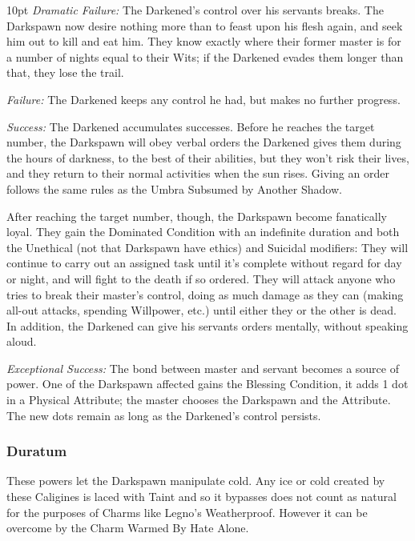 \begin{myindentpar}{10pt}    \emph{Dramatic Failure:} The Darkened's control over his servants breaks. The Darkspawn now desire nothing more than to feast upon his flesh again, and seek him out to kill and eat him. They know exactly where their former master is for a number of nights equal to their Wits; if the Darkened evades them longer than that, they lose the trail.

    \emph{Failure:} The Darkened keeps any control he had, but makes no further progress.

    \emph{Success:} The Darkened accumulates successes. Before he reaches the target number, the Darkspawn will obey verbal orders the Darkened gives them during the hours of darkness, to the best of their abilities, but they won't risk their lives, and they return to their normal activities when the sun rises. Giving an order follows the same rules as the Umbra Subsumed by Another Shadow.

    After reaching the target number, though, the Darkspawn become fanatically loyal. They gain the Dominated Condition with an indefinite duration and both the Unethical (not that Darkspawn have ethics) and Suicidal modifiers: They will continue to carry out an assigned task until it's complete without regard for day or night, and will fight to the death if so ordered. They will attack anyone who tries to break their master's control, doing as much damage as they can (making all-out attacks, spending Willpower, etc.) until either they or the other is dead. In addition, the Darkened can give his servants orders mentally, without speaking aloud.

    \emph{Exceptional Success:} The bond between master and servant becomes a source of power. One of the Darkspawn affected gains the Blessing Condition, it adds 1 dot in a Physical Attribute; the master chooses the Darkspawn and the Attribute. The new dots remain as long as the Darkened's control persists.\end{myindentpar}

\subsubsection*{Duratum}

These powers let the Darkspawn manipulate cold. Any ice or cold created by these Caligines is laced with Taint and so it bypasses does not count as natural for the purposes of Charms like Legno’s Weatherproof. However it can be overcome by the Charm Warmed By Hate Alone. 


